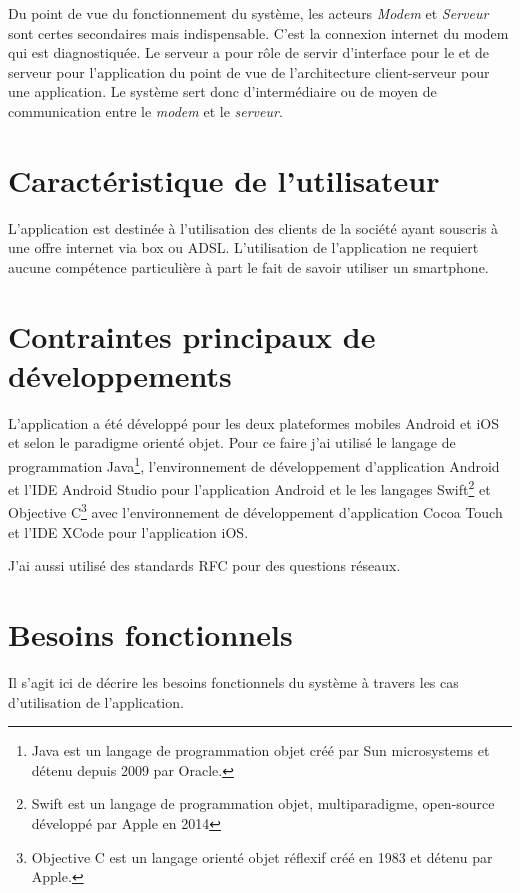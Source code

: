 Du point de vue du fonctionnement du système, les acteurs \emph{Modem} et \emph{Serveur} sont certes secondaires mais indispensable. C'est la connexion internet du modem qui est diagnostiquée. Le serveur a pour rôle de servir d'interface pour le \hd et de serveur pour l'application du point de vue de l'architecture client-serveur pour une application. Le système sert donc d'intermédiaire ou de moyen de communication entre le \emph{modem} et le \emph{serveur}.

\section{Caractéristique de l'utilisateur}
L'application est destinée à l'utilisation des clients de la société \lol ayant souscris à une offre internet via box ou ADSL. L'utilisation de l'application ne requiert aucune compétence particulière à part le fait de savoir utiliser un smartphone.

\section{Contraintes principaux de développements}
L'application a été développé pour les deux plateformes mobiles Android et iOS et selon le paradigme orienté objet. Pour ce faire j'ai utilisé le langage de programmation Java\footnote{Java est un langage de programmation objet créé par Sun microsystems et détenu depuis 2009 par Oracle. }, l'environnement de  développement d'application Android et l'IDE Android Studio pour l'application Android et le les langages Swift\footnote{Swift est un langage de programmation objet, multiparadigme, open-source développé par Apple en 2014 } et Objective C\footnote{Objective C est un langage orienté objet réflexif créé en 1983 et détenu par Apple.} avec l'environnement de développement d'application Cocoa Touch et l'IDE XCode pour l'application iOS. 

J'ai aussi utilisé des standards RFC pour des questions réseaux.

\section{Besoins fonctionnels}
Il s'agit ici de décrire les besoins fonctionnels du système à travers les cas d'utilisation de l'application.
